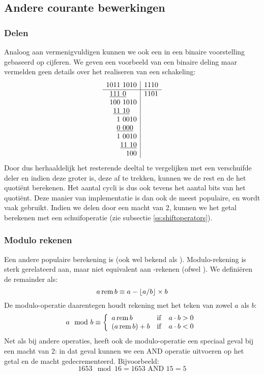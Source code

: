 \subsection{Andere courante bewerkingen}
\subsubsection{Delen}
Analoog aan vermenigvuldigen kunnen we ook een  in een binaire voorstelling gebaseerd op cijferen. We geven een voorbeeld van een binaire deling maar vermelden geen details over het realiseren van een schakeling:
\begin{equation}
\begin{array}{r|l}
1011\ 1010&1110\\\hline
\underline{111\ 0}\textcolor{white}{000}&1101\\
100\ 1010&\\
\underline{11\ 10}\textcolor{white}{00}&\\
1\ 0010&\\
\underline{0\ 000}\textcolor{white}{0}&\\
1\ 0010&\\
\underline{11\ 10}&\\
100&
\end{array}
\end{equation}
Door dus herhaaldelijk het resterende deeltal te vergelijken met een verschuifde deler en indien deze groter is, deze af te trekken, kunnen we de rest en de het quoti\"ent berekenen. Het aantal cycli is dus ook tevens het aantal bits van het quoti\"ent. Deze manier van implementatie is dan ook de meest populaire, en wordt vaak gebruikt. Indien we delen door een macht van 2, kunnen we het getal berekenen met een schuifoperatie (zie subsectie \ref{ss:shiftoperators}).
\subsubsection{Modulo rekenen}
Een andere populaire berekening is  (ook wel bekend als \termen{$\mod$}). Modulo-rekening is sterk gerelateerd aan, maar niet equivalent aan -rekenen (ofwel \termen{$\rem$}). We defini\"eren de remainder als:
\begin{equation}
a\operatorname{rem} b\equiv a-\left\lfloor a/b\right\rfloor\times b
\end{equation}
De modulo-operatie daarentegen houdt rekening met het teken van zowel $a$ als $b$:
\begin{equation}
a\mod b\equiv \left\{\begin{array}{lcl}
a\operatorname{rem} b&\operatorname{if}&a\cdot b>0\\
\left(a\operatorname{rem} b\right)+b&\operatorname{if}&a\cdot b<0
\end{array}\right.
\end{equation}
Net als bij andere operaties, heeft ook de modulo-operatie een speciaal geval bij een macht van 2: in dat geval kunnen we een AND operatie uitvoeren op het getal en de macht gedecrementeerd. Bijvoorbeeld:
\begin{equation}
1653\mod 16=1653\mbox{ AND }15=5
\end{equation}
